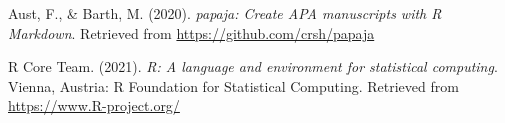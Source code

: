 \documentclass[
  english,
  man]{apa6}
\newlength{\cslhangindent}
\newlength{\cslentryspacingunit} %
\newenvironment{CSLReferences}[2] %
 {%
  \setlength{\parindent}{0pt}
  \ifodd #1
  \let\oldpar\par
  \def\par{\hangindent=\cslhangindent\oldpar}
  \fi
  \setlength{\parskip}{#2\cslentryspacingunit}
 }%
 {}
\begin{document}
\begingroup
\setlength{\parindent}{-0.5in}
\setlength{\leftskip}{0.5in}

\hypertarget{refs}{}
\begin{CSLReferences}{1}{0}
\leavevmode{}%
Aust, F., \& Barth, M. (2020). \emph{{papaja}: {Create} {APA} manuscripts with {R Markdown}}. Retrieved from \url{https://github.com/crsh/papaja}

\leavevmode{}%
R Core Team. (2021). \emph{R: A language and environment for statistical computing}. Vienna, Austria: R Foundation for Statistical Computing. Retrieved from \url{https://www.R-project.org/}

\end{CSLReferences}

\endgroup
\end{document}
